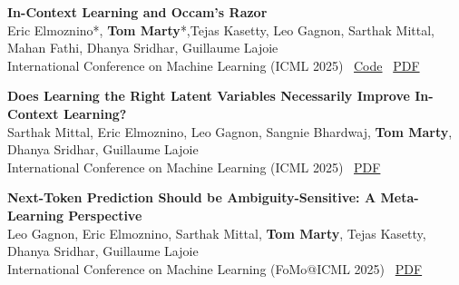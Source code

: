 \documentclass[letterpaper,11pt]{article}
\begin{document}
\begin{tcolorbox}[enhanced, rounded corners, colback=white, colframe=black!10!white, boxrule=0.5mm, left=10pt, right=10pt, top=6pt, bottom=3pt]
    \textbf{In-Context Learning and Occam's Razor} \\
    Eric Elmoznino*, \textbf{Tom Marty}*,Tejas Kasetty, Leo Gagnon, Sarthak Mittal, Mahan Fathi, Dhanya Sridhar, Guillaume Lajoie \\
    International Conference on Machine Learning (ICML 2025)  \hfill  \faCode  \, \href{https://github.com/3rdCore/PrequentialCode}{Code} \quad
    \faFilePdf \, \href{https://arxiv.org/abs/2410.14086}{PDF}
\end{tcolorbox}

\begin{tcolorbox}[enhanced, rounded corners, colback=white, colframe=black!10!white, boxrule=0.5mm, left=10pt, right=10pt, top=6pt, bottom=3pt]
    \textbf{Does Learning the Right Latent Variables Necessarily Improve In-Context Learning?} \\
    Sarthak Mittal, Eric Elmoznino, Leo Gagnon, Sangnie Bhardwaj, \textbf{Tom Marty}, Dhanya Sridhar, Guillaume Lajoie \\
    International Conference on Machine Learning (ICML 2025)  \hfill \quad
    \faFilePdf \, \href{https://openreview.net/forum?id=vE0bhgmDze&referrer=%5BAuthor%20Console%5D(%2Fgroup%3Fid%3DICML.cc%2F2025%2FWorkshop%2FES-FoMo-III%2FAuthors%23your-submissions)}{PDF}
\end{tcolorbox}

\begin{tcolorbox}[enhanced, rounded corners, colback=white, colframe=black!10!white, boxrule=0.5mm, left=10pt, right=10pt, top=6pt, bottom=3pt]
    \textbf{Next-Token Prediction Should be Ambiguity-Sensitive: A Meta-Learning Perspective} \\
    Leo Gagnon, Eric Elmoznino, Sarthak Mittal, \textbf{Tom Marty}, Tejas Kasetty, Dhanya Sridhar, Guillaume Lajoie \\
    International Conference on Machine Learning (FoMo@ICML 2025)  \hfill \quad
    \faFilePdf \, \href{https://openreview.net/forum?id=vE0bhgmDze&referrer=%5BAuthor%20Console%5D(%2Fgroup%3Fid%3DICML.cc%2F2025%2FWorkshop%2FES-FoMo-III%2FAuthors%23your-submissions)}{PDF}
\end{tcolorbox}
\end{document}
